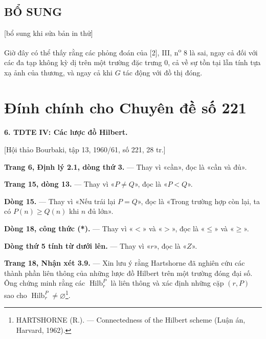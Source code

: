 \documentclass[11pt,twoside,openany]{book}
\numberwithin{equation}{section}
\newcommand{\src}[1]{%
  \phantomsection\hypertarget{src:\fgasourceid:#1}{}%
  \marginpar{\raggedleft\footnotesize\sffamily #1}%
}
\newcommand{\fgasourceid}{unset}
\newcommand{\sid}[1]{\gdef\fgasourceid{#1}\phantomsection\hypertarget{fga:#1}{}}
\begin{document}
\section*{BỔ SUNG}
\begin{center}
{\small [bổ sung khi sửa bản in thử]}
\end{center}

Giờ đây có thể thấy rằng các phỏng đoán của [2], III,
n\textsuperscript{o} 8 là sai, ngay cả đối với các đa tạp không kỳ dị trên một
trường đặc trưng 0, cả về sự tồn tại lẫn tính tựa xạ ảnh của thương, và ngay cả
khi $G$ tác động với đồ thị đóng.

\par

\clearpage
\chapter*{Đính chính cho Chuyên đề số 221}
\setcounter{footnote}{3}
\sid{e221}
\src{302}

\noindent\textbf{6. TDTE IV: Các lược đồ Hilbert.}

\begin{center}
[Hội thảo Bourbaki, tập 13, 1960/61, số 221, 28 tr.]
\end{center}

\noindent\textbf{Trang 6, Định lý 2.1, dòng thứ 3.} --- Thay vì
«cần», đọc là «cần và đủ».

\noindent\textbf{Trang 15, dòng 13.} --- Thay vì «$P\neq Q$», đọc là
«$P<Q$».

\noindent\textbf{Dòng 15.} --- Thay vì «Nếu trái lại $P=Q$», đọc là
«Trong trường hợp còn lại, ta có $P(n)\geq Q(n)$ khi $n$ đủ lớn».

\noindent\textbf{Dòng 18, công thức (*).} --- Thay vì «$<$» và «$>$»,
đọc là «$\leq$» và «$\geq$».

\noindent\textbf{Dòng thứ 5 tính từ dưới lên.} --- Thay vì «$r$», đọc là
«$Z$».

\noindent\textbf{Trang 18, Nhận xét 3.9.} --- Xin lưu ý rằng Hartshorne đã
nghiên cứu các thành phần liên thông của những lược đồ Hilbert trên một trường
đóng đại số. Ông chứng minh rằng các $\operatorname{Hilb}^{P}_{r}$ là liên
thông và xác định những cặp $(r,P)$ sao cho
$\operatorname{Hilb}^{P}_{r}\neq\varnothing$\footnote{HARTSHORNE
(R.). --- Connectedness of the Hilbert scheme (Luận án, Harvard, 1962).}.
\end{document}
